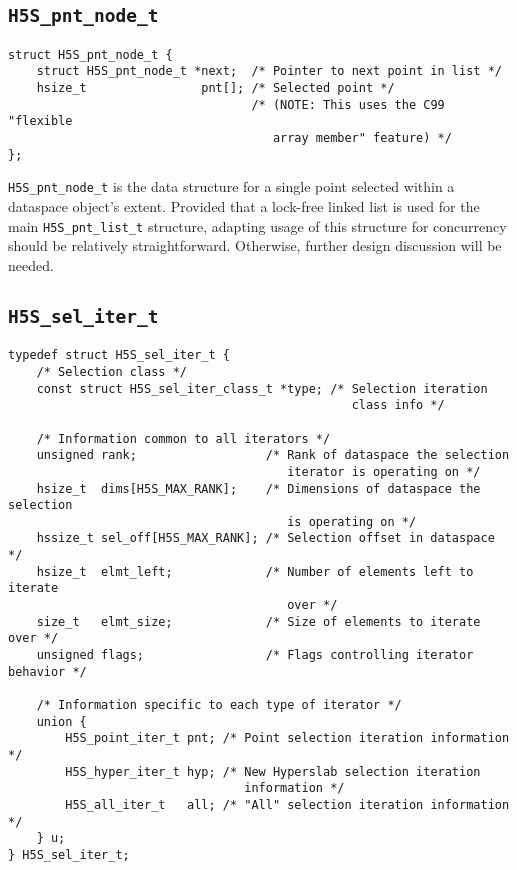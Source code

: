 \documentclass[../HDF5_RFC.tex]{subfiles}
\begin{document}
\subsection{\texttt{H5S\_pnt\_node\_t}}
\label{apdx:h5s_struct_h5s_pnt_node_t}

\begin{verbatim}
struct H5S_pnt_node_t {
    struct H5S_pnt_node_t *next;  /* Pointer to next point in list */
    hsize_t                pnt[]; /* Selected point */
                                  /* (NOTE: This uses the C99 "flexible
                                     array member" feature) */
};
\end{verbatim}

\texttt{H5S\_pnt\_node\_t} is the data structure for a single point selected within a dataspace
object's extent. Provided that a lock-free linked list is used for the main \texttt{H5S\_pnt\_list\_t}
structure, adapting usage of this structure for concurrency should be relatively straightforward.
Otherwise, further design discussion will be needed.

\subsection{\texttt{H5S\_sel\_iter\_t}}
\label{apdx:h5s_struct_h5s_sel_iter_t}

\begin{verbatim}
typedef struct H5S_sel_iter_t {
    /* Selection class */
    const struct H5S_sel_iter_class_t *type; /* Selection iteration
                                                class info */

    /* Information common to all iterators */
    unsigned rank;                  /* Rank of dataspace the selection
                                       iterator is operating on */
    hsize_t  dims[H5S_MAX_RANK];    /* Dimensions of dataspace the selection
                                       is operating on */
    hssize_t sel_off[H5S_MAX_RANK]; /* Selection offset in dataspace */
    hsize_t  elmt_left;             /* Number of elements left to iterate
                                       over */
    size_t   elmt_size;             /* Size of elements to iterate over */
    unsigned flags;                 /* Flags controlling iterator behavior */

    /* Information specific to each type of iterator */
    union {
        H5S_point_iter_t pnt; /* Point selection iteration information */
        H5S_hyper_iter_t hyp; /* New Hyperslab selection iteration
                                 information */
        H5S_all_iter_t   all; /* "All" selection iteration information */
    } u;
} H5S_sel_iter_t;
\end{verbatim}
\end{document}
